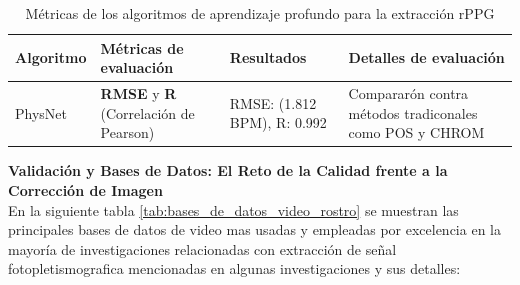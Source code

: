 \begin{table}[htbp] 
    \centering 
    \caption{Métricas de los algoritmos de aprendizaje profundo para la extracción rPPG} 
    \label{tab:metricas_algoritmos} 
    \begin{tabular}{|p{2.5cm}|p{2.3cm}|p{3.2cm}|p{4.8cm}|} 
        \hline 
        \textbf{Algoritmo} & \textbf{Métricas de evaluación} & \textbf{Resultados} & \textbf{Detalles de evaluación} \\ \hline


        PhysNet & \textbf{RMSE} y \textbf{R} (Correlación de Pearson) & RMSE: (1.812 BPM), R: 0.992 & Compararón contra métodos tradiconales como POS y CHROM \\ \hline
    \end{tabular}
\end{table}




\newpage
\textbf{Validación y Bases de Datos: El Reto de la Calidad frente a la Corrección de Imagen}\\

En la siguiente tabla \ref{tab:bases_de_datos_video_rostro} se muestran las principales bases de datos de video mas usadas y empleadas por excelencia en la
mayoría de investigaciones relacionadas con extracción de señal fotopletismografica mencionadas en algunas investigaciones y sus detalles:


